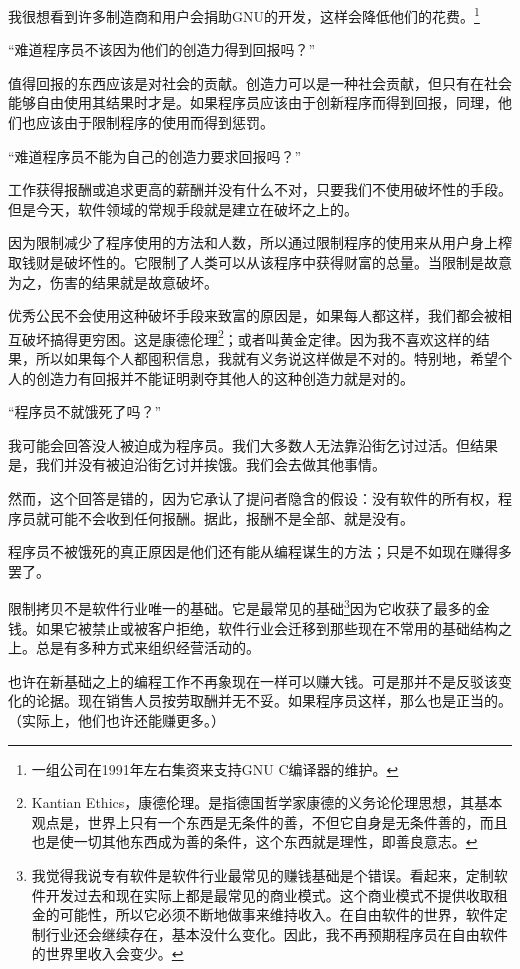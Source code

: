 \documentclass{book}
\begin{document}
我很想看到许多制造商和用户会捐助GNU的开发，这样会降低他们的花费。\footnote{一组公司在1991年左右集资来支持GNU C编译器的维护。}\par
“难道程序员不该因为他们的创造力得到回报吗？”\par
值得回报的东西应该是对社会的贡献。创造力可以是一种社会贡献，但只有在社会能够自由使用其结果时才是。如果程序员应该由于创新程序而得到回报，同理，他们也应该由于限制程序的使用而得到惩罚。\par
“难道程序员不能为自己的创造力要求回报吗？”\par
工作获得报酬或追求更高的薪酬并没有什么不对，只要我们不使用破坏性的手段。但是今天，软件领域的常规手段就是建立在破坏之上的。\par
因为限制减少了程序使用的方法和人数，所以通过限制程序的使用来从用户身上榨取钱财是破坏性的。它限制了人类可以从该程序中获得财富的总量。当限制是故意为之，伤害的结果就是故意破坏。\par
优秀公民不会使用这种破坏手段来致富的原因是，如果每人都这样，我们都会被相互破坏搞得更穷困。这是康德伦理\footnote{Kantian Ethics，康德伦理。是指德国哲学家康德的义务论伦理思想，其基本观点是，世界上只有一个东西是无条件的善，不但它自身是无条件善的，而且也是使一切其他东西成为善的条件，这个东西就是理性，即善良意志。}；或者叫黄金定律。因为我不喜欢这样的结果，所以如果每个人都囤积信息，我就有义务说这样做是不对的。特别地，希望个人的创造力有回报并不能证明剥夺其他人的这种创造力就是对的。\par
“程序员不就饿死了吗？”\par
我可能会回答没人被迫成为程序员。我们大多数人无法靠沿街乞讨过活。但结果是，我们并没有被迫沿街乞讨并挨饿。我们会去做其他事情。\par
然而，这个回答是错的，因为它承认了提问者隐含的假设：没有软件的所有权，程序员就可能不会收到任何报酬。据此，报酬不是全部、就是没有。\par
程序员不被饿死的真正原因是他们还有能从编程谋生的方法；只是不如现在赚得多罢了。\par
限制拷贝不是软件行业唯一的基础。它是最常见的基础\footnote{我觉得我说专有软件是软件行业最常见的赚钱基础是个错误。看起来，定制软件开发过去和现在实际上都是最常见的商业模式。这个商业模式不提供收取租金的可能性，所以它必须不断地做事来维持收入。在自由软件的世界，软件定制行业还会继续存在，基本没什么变化。因此，我不再预期程序员在自由软件的世界里收入会变少。}因为它收获了最多的金钱。如果它被禁止或被客户拒绝，软件行业会迁移到那些现在不常用的基础结构之上。总是有多种方式来组织经营活动的。\par
也许在新基础之上的编程工作不再象现在一样可以赚大钱。可是那并不是反驳该变化的论据。现在销售人员按劳取酬并无不妥。如果程序员这样，那么也是正当的。（实际上，他们也许还能赚更多。）\par
\end{document}
